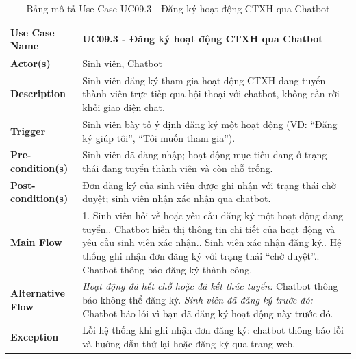\begin{table}[H]
	\centering
	\renewcommand{\arraystretch}{1.25}
	\begin{tabular}{|p{3.8cm}|p{11.2cm}|}
		\hline
		\textbf{Use Case Name} & \textbf{UC09.3 - Đăng ký hoạt động CTXH qua Chatbot} \\ \hline
		\textbf{Actor(s)} & Sinh viên, Chatbot \\ \hline
		\textbf{Description} & Sinh viên đăng ký tham gia hoạt động CTXH đang tuyển thành viên trực tiếp qua hội thoại với chatbot, không cần rời khỏi giao diện chat. \\ \hline
		\textbf{Trigger} & Sinh viên bày tỏ ý định đăng ký một hoạt động (VD: ``Đăng ký giúp tôi'', ``Tôi muốn tham gia''). \\ \hline
		\textbf{Pre-condition(s)} & Sinh viên đã đăng nhập; hoạt động mục tiêu đang ở trạng thái đang tuyển thành viên và còn chỗ trống. \\ \hline
		\textbf{Post-condition(s)} & Đơn đăng ký của sinh viên được ghi nhận với trạng thái chờ duyệt; sinh viên nhận xác nhận qua chatbot. \\ \hline
		\textbf{Main Flow} &
		1. Sinh viên hỏi về hoặc yêu cầu đăng ký một hoạt động đang tuyển.\newline
		2. Chatbot hiển thị thông tin chi tiết của hoạt động và yêu cầu sinh viên xác nhận.\newline
		3. Sinh viên xác nhận đăng ký.\newline
		4. Hệ thống ghi nhận đơn đăng ký với trạng thái ``chờ duyệt''.\newline
		5. Chatbot thông báo đăng ký thành công. \\ \hline
		\textbf{Alternative Flow} &
		\textit{Hoạt động đã hết chỗ hoặc đã kết thúc tuyển:} Chatbot thông báo không thể đăng ký.\newline
		\textit{Sinh viên đã đăng ký trước đó:} Chatbot báo lỗi vì bạn đã đăng ký hoạt động này trước đó. \\ \hline
		\textbf{Exception} & Lỗi hệ thống khi ghi nhận đơn đăng ký: chatbot thông báo lỗi và hướng dẫn thử lại hoặc đăng ký qua trang web. \\ \hline
	\end{tabular}
	\caption{Bảng mô tả Use Case UC09.3 - Đăng ký hoạt động CTXH qua Chatbot}
\end{table}

